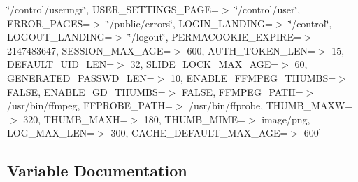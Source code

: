 \begin{DoxyCompactItemize}
\char`\"{}/control/usermgr\char`\"{}, \textquotesingle{}U\+S\+E\+R\+\_\+\+S\+E\+T\+T\+I\+N\+G\+S\+\_\+\+P\+A\+GE\textquotesingle{}=$>$ \char`\"{}/control/user\char`\"{}, \textquotesingle{}E\+R\+R\+O\+R\+\_\+\+P\+A\+G\+ES\textquotesingle{}=$>$ \char`\"{}/public/errors\char`\"{}, \textquotesingle{}L\+O\+G\+I\+N\+\_\+\+L\+A\+N\+D\+I\+NG\textquotesingle{}=$>$ \char`\"{}/control\char`\"{}, \textquotesingle{}L\+O\+G\+O\+U\+T\+\_\+\+L\+A\+N\+D\+I\+NG\textquotesingle{}=$>$ \char`\"{}/logout\char`\"{}, \textquotesingle{}P\+E\+R\+M\+A\+C\+O\+O\+K\+I\+E\+\_\+\+E\+X\+P\+I\+RE\textquotesingle{}=$>$ 2147483647, \textquotesingle{}S\+E\+S\+S\+I\+O\+N\+\_\+\+M\+A\+X\+\_\+\+A\+GE\textquotesingle{}=$>$ 600, \textquotesingle{}A\+U\+T\+H\+\_\+\+T\+O\+K\+E\+N\+\_\+\+L\+EN\textquotesingle{}=$>$ 15, \textquotesingle{}D\+E\+F\+A\+U\+L\+T\+\_\+\+U\+I\+D\+\_\+\+L\+EN\textquotesingle{}=$>$ 32, \textquotesingle{}S\+L\+I\+D\+E\+\_\+\+L\+O\+C\+K\+\_\+\+M\+A\+X\+\_\+\+A\+GE\textquotesingle{}=$>$ 60, \textquotesingle{}G\+E\+N\+E\+R\+A\+T\+E\+D\+\_\+\+P\+A\+S\+S\+W\+D\+\_\+\+L\+EN\textquotesingle{}=$>$ 10, \textquotesingle{}E\+N\+A\+B\+L\+E\+\_\+\+F\+F\+M\+P\+E\+G\+\_\+\+T\+H\+U\+M\+BS\textquotesingle{}=$>$ F\+A\+L\+SE, \textquotesingle{}E\+N\+A\+B\+L\+E\+\_\+\+G\+D\+\_\+\+T\+H\+U\+M\+BS\textquotesingle{}=$>$ F\+A\+L\+SE, \textquotesingle{}F\+F\+M\+P\+E\+G\+\_\+\+P\+A\+TH\textquotesingle{}=$>$ \textquotesingle{}/usr/bin/ffmpeg\textquotesingle{}, \textquotesingle{}F\+F\+P\+R\+O\+B\+E\+\_\+\+P\+A\+TH\textquotesingle{}=$>$ \textquotesingle{}/usr/bin/ffprobe\textquotesingle{}, \textquotesingle{}T\+H\+U\+M\+B\+\_\+\+M\+A\+XW\textquotesingle{}=$>$ 320, \textquotesingle{}T\+H\+U\+M\+B\+\_\+\+M\+A\+XH\textquotesingle{}=$>$ 180, \textquotesingle{}T\+H\+U\+M\+B\+\_\+\+M\+I\+ME\textquotesingle{}=$>$ \textquotesingle{}image/png\textquotesingle{}, \textquotesingle{}L\+O\+G\+\_\+\+M\+A\+X\+\_\+\+L\+EN\textquotesingle{}=$>$ 300, \textquotesingle{}C\+A\+C\+H\+E\+\_\+\+D\+E\+F\+A\+U\+L\+T\+\_\+\+M\+A\+X\+\_\+\+A\+GE\textquotesingle{}=$>$ 600\mbox{]}
\end{DoxyCompactItemize}


\subsection{Variable Documentation}
\mbox{\label{conf_200-default_8php_aaae9415d44e44dab44a7472db38273e0}} 
